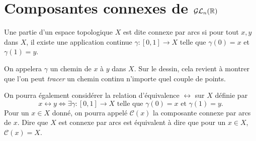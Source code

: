 \documentclass[../main.tex]{subfiles}
\begin{document}
\section{Composantes connexes de \(\mathcal{GL}_n(\mathbb{R})\)}
\begin{definition}
    Une partie d'un espace topologique \(X\) est dite connexe par arcs si pour tout \(x,y\) dans \(X\), il existe
    une application continue \(\gamma:[0,1]\to X\) telle que \(\gamma(0)=x\) et \(\gamma(1)=y\).
    \begin{remark} On appelera \(\gamma\) un chemin de \(x\) à \(y\) dans \(X\). Sur le dessin, cela revient 
        à montrer que l'on peut \textit{tracer} un chemin continu n'importe quel couple de points.
    \end{remark}
\end{definition}
On pourra également considérer la relation d'équivalence \(\longleftrightarrow\) sur \(X\) définie par
\begin{equation}
    x\longleftrightarrow y \iff \exists \gamma:[0,1]\to X \text{ telle que } \gamma(0) = x \text{ et } \gamma(1) = y.
\end{equation}
Pour un \(x\in X\) donné, on pourra appelé \(\mathcal{C}(x)\) la composante connexe par arcs de \(x\).
Dire que \(X\) est connexe par arcs est équivalent à dire que pour un \(x\in X\), \(\mathcal{C}(x) = X\).\\
\end{document}
